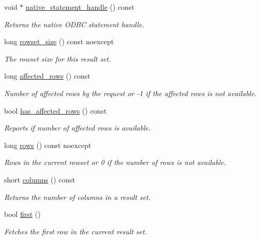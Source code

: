 \begin{DoxyCompactItemize}
void $\ast$ \mbox{\hyperlink{classnanodbc_1_1result_aa98342a662f490baeaaf686e815b0896}{native\+\_\+statement\+\_\+handle}} () const
\begin{DoxyCompactList}\small\item\em Returns the native O\+D\+BC statement handle. \end{DoxyCompactList}\item 
long \mbox{\hyperlink{classnanodbc_1_1result_adea873810ff2e393096c16aabeadd48f}{rowset\+\_\+size}} () const noexcept
\begin{DoxyCompactList}\small\item\em The rowset size for this result set. \end{DoxyCompactList}\item 
long \mbox{\hyperlink{classnanodbc_1_1result_ab038630cf35248dc6731eea37b14d12d}{affected\+\_\+rows}} () const
\begin{DoxyCompactList}\small\item\em Number of affected rows by the request or -\/1 if the affected rows is not available. \end{DoxyCompactList}\item 
bool \mbox{\hyperlink{classnanodbc_1_1result_aba877de8e2cb4e17235464b3b9b7c069}{has\+\_\+affected\+\_\+rows}} () const
\begin{DoxyCompactList}\small\item\em Reports if number of affected rows is available. \end{DoxyCompactList}\item 
long \mbox{\hyperlink{classnanodbc_1_1result_a7138ae9ec911fd4694a5c81ef902db89}{rows}} () const noexcept
\begin{DoxyCompactList}\small\item\em Rows in the current rowset or 0 if the number of rows is not available. \end{DoxyCompactList}\item 
short \mbox{\hyperlink{classnanodbc_1_1result_af21bbbe31f0e2578701edb3b386cd536}{columns}} () const
\begin{DoxyCompactList}\small\item\em Returns the number of columns in a result set. \end{DoxyCompactList}\item 
bool \mbox{\hyperlink{classnanodbc_1_1result_a8ce75f4ab1bb039c6ee6724966f54a93}{first}} ()
\begin{DoxyCompactList}\small\item\em Fetches the first row in the current result set. \end{DoxyCompactList}\item 

\end{DoxyCompactItemize}
